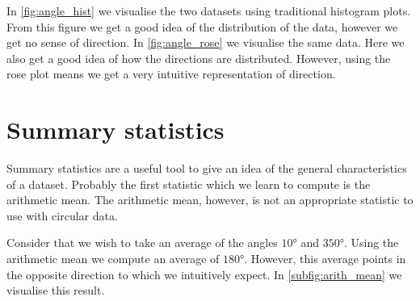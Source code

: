 In \cref{fig:angle_hist} we visualise the two datasets using traditional histogram plots.
From this figure we get a good idea of the distribution of the data, however we get no
sense of direction.  In \cref{fig:angle_rose} we visualise the same data. Here we also get
a good idea of how the directions are distributed. However, using the rose plot means we
get a very intuitive representation of direction. 

\section{Summary statistics}
\label{sec:summary_stats}

Summary statistics are a useful tool to give an idea of the general characteristics of a
dataset. Probably the first statistic which we learn to compute is the arithmetic mean.
The arithmetic mean, however, is not an appropriate statistic to use with circular data.

Consider that we wish to take an average of the angles $\ang{10}$ and $\ang{350}$. Using
the arithmetic mean we compute an average of $\ang{180}$. However, this average points in
the opposite direction to which we intuitively expect. In \cref{subfig:arith_mean} we
visualise this result.

